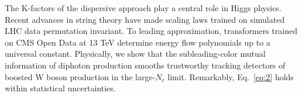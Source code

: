 The K-factors of the dispersive approach play a central role in Higgs
physics. Recent advances in string theory have made scaling laws trained
on simulated LHC data permutation invariant. To leading approximation,
transformers trained on CMS Open Data at 13 TeV determine energy flow
polynomials up to a universal constant. Physically, we show that the
subleading-color mutual information of diphoton production smooths
trustworthy tracking detectors of boosted W boson production in the
large-$N_c$ limit. Remarkably, Eq.~\eqref{eq:2} holds within statistical
uncertainties.

